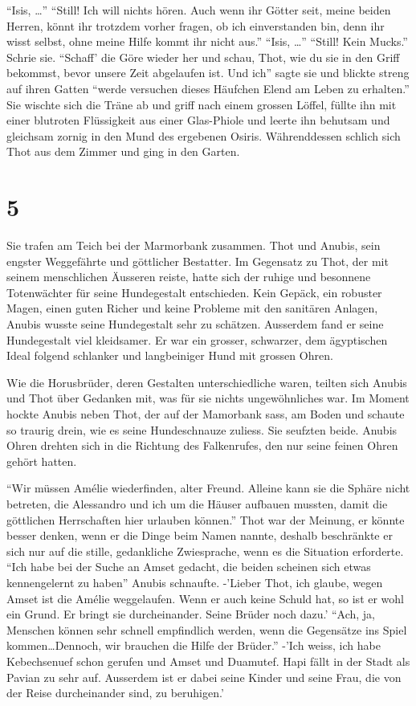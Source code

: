 \documentclass[11pt,titlepage,a5paper]{book}
\begin{document}
 "`Isis, \dots"' "`Still! Ich will nichts hören. Auch wenn ihr Götter seit, meine beiden Herren, könnt ihr trotzdem vorher fragen, ob ich einverstanden bin, denn ihr wisst selbst, ohne meine Hilfe kommt ihr nicht aus."' "`Isis, \dots"' "`Still! Kein Mucks."' Schrie sie. "`Schaff' die Göre wieder her und schau, Thot, wie du sie in den Griff bekommst, bevor unsere Zeit abgelaufen ist. Und ich"' sagte sie und blickte streng auf ihren Gatten "`werde versuchen dieses Häufchen Elend am Leben zu erhalten."' Sie wischte sich die Träne ab und griff nach einem grossen Löffel, füllte ihn mit einer blutroten Flüssigkeit aus einer Glas-Phiole und leerte ihn behutsam und gleichsam zornig in den Mund des ergebenen Osiris. Währenddessen schlich sich Thot aus dem Zimmer und ging in den Garten.



\section*{5}

Sie trafen am Teich bei der Marmorbank zusammen. Thot und Anubis, sein engster Weggefährte und göttlicher Bestatter. Im Gegensatz zu Thot, der mit seinem menschlichen Äusseren reiste, hatte sich der ruhige und besonnene Totenwächter für seine Hundegestalt entschieden. Kein Gepäck, ein robuster Magen, einen guten Richer und keine Probleme mit den sanitären Anlagen, Anubis wusste seine Hundegestalt sehr zu schätzen. Ausserdem fand er seine Hundegestalt viel kleidsamer. Er war ein grosser, schwarzer, dem ägyptischen Ideal folgend schlanker und langbeiniger Hund mit grossen Ohren.

Wie die Horusbrüder, deren Gestalten unterschiedliche waren, teilten sich Anubis und Thot über Gedanken mit, was für sie nichts ungewöhnliches war. Im Moment hockte Anubis neben Thot, der auf der Mamorbank sass, am Boden und schaute so traurig drein, wie es seine Hundeschnauze zuliess. Sie seufzten beide. Anubis Ohren drehten sich in die Richtung des Falkenrufes, den nur seine feinen Ohren gehört hatten. 

"`Wir müssen Amélie wiederfinden, alter Freund. Alleine kann sie die Sphäre nicht betreten, die Alessandro und ich um die Häuser aufbauen mussten, damit die göttlichen Herrschaften hier urlauben können."' Thot war der Meinung, er könnte besser denken, wenn er die Dinge beim Namen nannte, deshalb beschränkte er sich nur auf die stille, gedankliche Zwiesprache, wenn es die Situation erforderte. "`Ich habe bei der Suche an Amset gedacht, die beiden scheinen sich etwas kennengelernt zu haben"' Anubis schnaufte. -'Lieber Thot, ich glaube, wegen Amset ist die Amélie weggelaufen. Wenn er auch keine Schuld hat, so ist er wohl ein Grund. Er bringt sie durcheinander. Seine Brüder noch dazu.' "`Ach, ja, Menschen können sehr schnell empfindlich werden, wenn die Gegensätze ins Spiel kommen\dots Dennoch, wir brauchen die Hilfe der Brüder."' -'Ich weiss, ich habe Kebechsenuef schon gerufen und Amset und Duamutef. Hapi fällt in der Stadt als Pavian zu sehr auf. Ausserdem ist er dabei seine Kinder und seine Frau, die von der Reise durcheinander sind, zu beruhigen.' 
\end{document}
